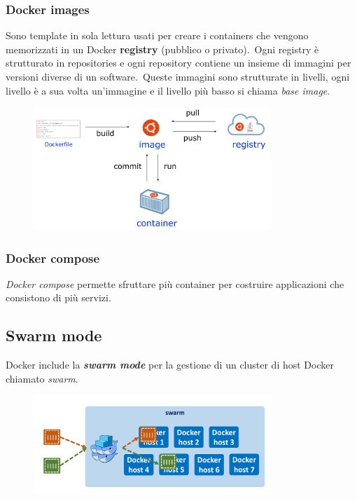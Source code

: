 \subsubsection{Docker images}
Sono template in sola lettura usati per creare i containers che vengono memorizzati in un Docker \textbf{registry} (pubblico o privato).\
Ogni registry è strutturato in repositories e ogni repository contiene un insieme di immagini per versioni diverse di un software.\
Queste immagini sono strutturate in livelli, ogni livello è a sua volta un'immagine e il livello più basso si chiama \textit{base image}.

\begin{figure}[H]
    \centering
    \includegraphics[width=0.8\textwidth]{immagini/docker_cmds.png}
\end{figure}

\subsubsection{Docker compose}

\textit{Docker compose} permette sfruttare più container per costruire applicazioni che consistono di più servizi.

\subsection{Swarm mode}

Docker include la \textbf{\textit{swarm mode}} per la gestione di un cluster di host Docker chiamato \textit{swarm}.

\begin{figure}[H]
    \centering
    \includegraphics[width=0.8\textwidth]{immagini/docker_swarm.png}
\end{figure}

